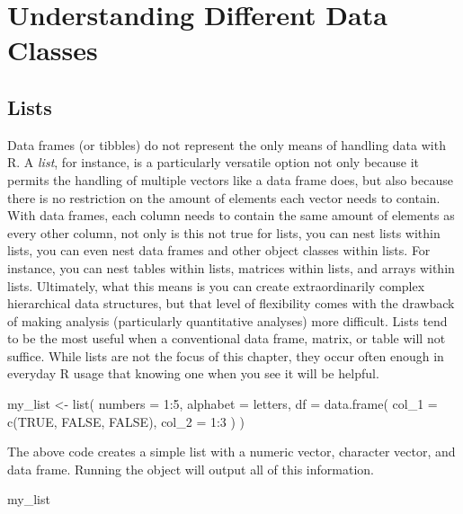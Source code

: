 \section{Understanding Different Data Classes}

\subsection{Lists}

Data frames (or tibbles) do not represent the only means of handling data with R. A \textit{list}, for instance, is a particularly versatile option not only because it permits the handling of multiple vectors like a data frame does, but also because there is no restriction on the amount of elements each vector needs to contain. With data frames, each column needs to contain the same amount of elements as every other column, not only is this not true for lists, you can nest lists within lists, you can even nest data frames and other object classes within lists. For instance, you can nest tables within lists, matrices within lists, and arrays within lists. Ultimately, what this means is you can create extraordinarily complex hierarchical data structures, but that level of flexibility comes with the drawback of making analysis (particularly quantitative analyses) more difficult. Lists tend to be the most useful when a conventional data frame, matrix, or table will not suffice. While lists are not the focus of this chapter, they occur often enough in everyday R usage that knowing one when you see it will be helpful.

\begin{inR}
my_list <- list(
  numbers = 1:5,
  alphabet = letters,
  df = data.frame(
    col_1 = c(TRUE, FALSE, FALSE),
    col_2 = 1:3
  )
)
\end{inR}

\vspace{1em}

The above code creates a simple list with a numeric vector, character vector, and data frame. Running the object  will output all of this information.

\begin{inR}
my_list
\end{inR}

